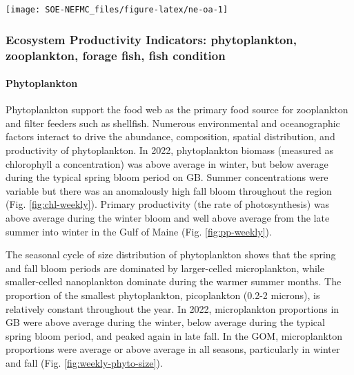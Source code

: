 \documentclass[
  10pt,
]{article}
\let\origfigure\figure
\let\endorigfigure\endfigure
\renewenvironment{figure}[1][2] {
    \expandafter\origfigure\expandafter[H]
} {
    \endorigfigure
}
\begin{document}
\begin{figure}

{\centering \texttt{[image: SOE-NEFMC\_files/figure-latex/ne-oa-1]} 

}

\caption{Left panel: Bottom aragonite saturation state ($\Omega_{Arag}$; summer only: June-August) on the U.S. Northeast Shelf based on quality-controlled vessel- and glider-based datasets from 2007-present. Right panel: Locations where summer bottom $\Omega_{Arag}$ were at or below the laboratory-derived sensitivity level for Atlantic cod (top panel) and American lobster (bottom). Gray circles indicate locations where carbonate chemistry samples were collected, but bottom $\Omega_{Arag}$ values were higher than sensitivity values determined for that species.}\label{fig:ne-oa}
\end{figure}

\hypertarget{ecosystem-productivity-indicators-phytoplankton-zooplankton-forage-fish-fish-condition}{%
\subsubsection{Ecosystem Productivity Indicators: phytoplankton, zooplankton, forage fish, fish condition}\label{ecosystem-productivity-indicators-phytoplankton-zooplankton-forage-fish-fish-condition}}

\hypertarget{phytoplankton}{%
\paragraph{Phytoplankton}\label{phytoplankton}}

Phytoplankton support the food web as the primary food source for zooplankton and filter feeders such as shellfish. Numerous environmental and oceanographic factors interact to drive the abundance, composition, spatial distribution, and productivity of phytoplankton. In 2022, phytoplankton biomass (measured as chlorophyll a concentration) was above average in winter, but below average during the typical spring bloom period on GB. Summer concentrations were variable but there was an anomalously high fall bloom throughout the region (Fig. \ref{fig:chl-weekly}). Primary productivity (the rate of photosynthesis) was above average during the winter bloom and well above average from the late summer into winter in the Gulf of Maine (Fig. \ref{fig:pp-weekly}).

The seasonal cycle of size distribution of phytoplankton shows that the spring and fall bloom periods are dominated by larger-celled microplankton, while smaller-celled nanoplankton dominate during the warmer summer months. The proportion of the smallest phytoplankton, picoplankton (0.2-2 microns), is relatively constant throughout the year. In 2022, microplankton proportions in GB were above average during the winter, below average during the typical spring bloom period, and peaked again in late fall. In the GOM, microplankton proportions were average or above average in all seasons, particularly in winter and fall (Fig. \ref{fig:weekly-phyto-size}).
\end{document}
